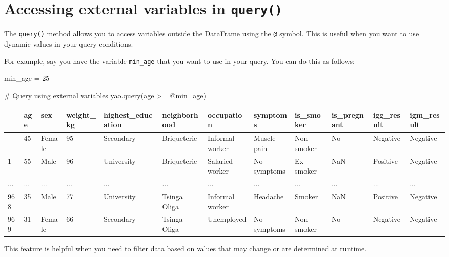 \documentclass[
  letterpaper,
  DIV=11,
  numbers=noendperiod]{scrreprt}
\newenvironment{Shaded}{\begin{snugshade}}{\end{snugshade}}
\newcommand{\CommentTok}[1]{\textcolor[rgb]{0.37,0.37,0.37}{#1}}
\newcommand{\DecValTok}[1]{\textcolor[rgb]{0.68,0.00,0.00}{#1}}
\newcommand{\NormalTok}[1]{\textcolor[rgb]{0.00,0.23,0.31}{#1}}
\newcommand{\OperatorTok}[1]{\textcolor[rgb]{0.37,0.37,0.37}{#1}}
\newcommand{\StringTok}[1]{\textcolor[rgb]{0.13,0.47,0.30}{#1}}
\begin{document}
\section{\texorpdfstring{Accessing external variables in
\texttt{query()}}{Accessing external variables in query()}}\label{accessing-external-variables-in-query}

The \texttt{query()} method allows you to access variables outside the
DataFrame using the \texttt{@} symbol. This is useful when you want to
use dynamic values in your query conditions.

For example, say you have the variable \texttt{min\_age} that you want
to use in your query. You can do this as follows:

\begin{Shaded}
\begin{Highlighting}[]
\NormalTok{min\_age }\OperatorTok{=} \DecValTok{25}

\CommentTok{\# Query using external variables}
\NormalTok{yao.query(}\StringTok{\textquotesingle{}age \textgreater{}= @min\_age\textquotesingle{}}\NormalTok{)}
\end{Highlighting}
\end{Shaded}

\begin{longtable}[]{@{}llllllllllll@{}}
\toprule\noalign{}
& age & sex & weight\_kg & highest\_education & neighborhood &
occupation & symptoms & is\_smoker & is\_pregnant & igg\_result &
igm\_result \\
\midrule\noalign{}
\endhead
\bottomrule\noalign{}
\endlastfoot
0 & 45 & Female & 95 & Secondary & Briqueterie & Informal worker &
Muscle pain & Non-smoker & No & Negative & Negative \\
1 & 55 & Male & 96 & University & Briqueterie & Salaried worker & No
symptoms & Ex-smoker & NaN & Positive & Negative \\
... & ... & ... & ... & ... & ... & ... & ... & ... & ... & ... & ... \\
968 & 35 & Male & 77 & University & Tsinga Oliga & Informal worker &
Headache & Smoker & NaN & Positive & Negative \\
969 & 31 & Female & 66 & Secondary & Tsinga Oliga & Unemployed & No
symptoms & Non-smoker & No & Negative & Negative \\
\end{longtable}

This feature is helpful when you need to filter data based on values
that may change or are determined at runtime.
\end{document}
